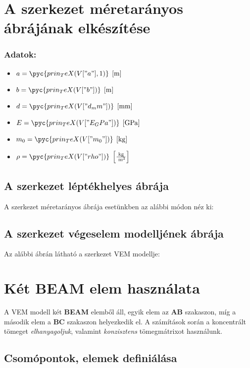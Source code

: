 \documentclass[12pt,a4paper]{article}
\def\m{\; \left[\mathrm{m}\right]}
\def\mili{\; \left[\mathrm{mm}\right]}
\def\Gpa{\; \left[\mathrm{GPa}\right]}
\def\kg{\; \left[\mathrm{kg}\right]}
\def\kgpm{\; \left[\mathrm{\frac{kg}{\; m^3}}\right]}
\begin{document}
\section{A szerkezet méretarányos ábrájának elkészítése}
\subsubsection*{Adatok:}

\begin{multicols}{2}
    \begin{itemize}
        \item $a=\pyc{prin_TeX(V["a"],1)}\m$
        \item $b=\pyc{prin_TeX(V["b"])}\m$
        \item $d=\pyc{prin_TeX(V["d_mm"])}\mili$
    \end{itemize}
    \columnbreak
    \begin{itemize}
        \item $E=\pyc{prin_TeX(V["E_GPa"])} \Gpa$
        \item $m_0=\pyc{prin_TeX(V["m_0"])} \kg$
        \item $\rho=\pyc{prin_TeX(V["rho"])} \kgpm $
    \end{itemize}
\end{multicols}

\subsection{A szerkezet léptékhelyes ábrája}
A szerkezet méretarányos ábrája esetünkben az alábbi módon néz ki:

\subsection{A szerkezet végeselem modelljének ábrája}
Az alábbi ábrán látható a szerkezet VEM modellje:

\section{Két BEAM elem használata}
A VEM modell két \textbf{BEAM} elemből áll, egyik elem az \textbf{AB} szakaszon,
míg a második elem a \textbf{BC} szakaszon helyezkedik el. A számítások során
a koncentrált tömeget \textit{elhanyagoljuk}, valamint \textit{konzisztens} tömegmátrixot
használunk.
\subsection{Csomópontok, elemek definiálása}
\end{document}
